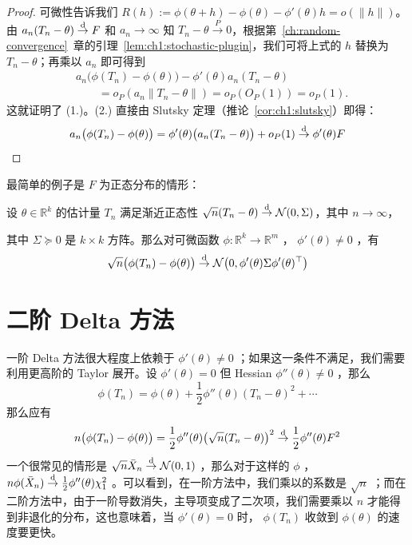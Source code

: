 \begin{proof}

可微性告诉我们 $R(h):=\phi(\theta+h)-\phi(\theta)-\phi'(\theta)h=o(\|h\|)$。由 $a_n(T_n-\theta)\overset{\rm d}\to F$ 和 $a_n\to\infty$ 知 $T_n-\theta \overset{P}\to 0$，根据第~\ref{ch:random-convergence}~章的引理~\ref{lem:ch1:stochastic-plugin}，我们可将上式的 $h$ 替换为 $T_n-\theta$；再乘以 $a_n$ 即可得到
\[
\begin{aligned}
&a_n\bigl(\phi(T_n)-\phi(\theta)\bigr)
-\phi'(\theta)a_n(T_n-\theta)\\
&\qquad=o_P(a_n\|T_n-\theta\|)
=o_P(O_P(1))=o_P(1).
\end{aligned}
\]
这就证明了 (1.)。(2.) 直接由 Slutsky 定理（推论~\ref{cor:ch1:slutsky}）即得：\\\[a_n\big(\phi(T_n)-\phi(\theta)\big) = \phi'(\theta)\big(a_n(T_n-\theta)\big) + o_P(1) \overset{\rm d}\to \phi'(\theta)F\]
\end{proof}

最简单的例子是 $F$ 为正态分布的情形：

\begin{corollary}\label{cor:ch5:delta-normal}
设 $\theta\in \mathbb R^k$ 的估计量 $T_n$ 满足渐近正态性 $\sqrt n(T_n-\theta)\overset{\rm d}\to \mathcal N(0,\Sigma)$，其中 $n\to\infty$，

其中 $\Sigma\succeq 0$ 是 $k\times k$ 方阵。那么对可微函数 $\phi:\mathbb R^k\to\mathbb R^m$ ， $\phi'(\theta)\ne 0$ ，有
\[\sqrt n\big(\phi(T_n)-\phi(\theta)\big)\overset{\rm d}\to \mathcal N\big(0,\phi'(\theta)\Sigma\phi'(\theta)^\top \big)\]\end{corollary}

\section{二阶 Delta 方法}

一阶 Delta 方法很大程度上依赖于 $\phi'(\theta)\ne 0$ ；如果这一条件不满足，我们需要利用更高阶的 Taylor 展开。设 $\phi'(\theta)=0$ 但 Hessian $\phi''(\theta)\ne 0$ ，那么
\[\phi(T_n)=\phi(\theta)+\frac12\phi''(\theta)(T_n-\theta)^2+\cdots\]
那么应有
\[n\big(\phi(T_n)-\phi(\theta)\big)=\frac12\phi''(\theta)\big(\sqrt n(T_n-\theta)\big)^2\overset{\rm d}\to \frac12\phi''(\theta)F^2\]
一个很常见的情形是 $\sqrt n\bar X_n\overset{\rm d}\to \mathcal N(0,1)$ ，那么对于这样的 $\phi$ ， $n\phi(\bar{X}_n)\overset{\rm d}\to \frac12\phi''(\theta)\chi_1^2$ 。可以看到，在一阶方法中，我们乘以的系数是 $\sqrt n$ ；而在二阶方法中，由于一阶导数消失，主导项变成了二次项，我们需要乘以 $n$ 才能得到非退化的分布，这也意味着，当 $\phi'(\theta)=0$ 时， $\phi(T_n)$ 收敛到 $\phi(\theta)$ 的速度要更快。

